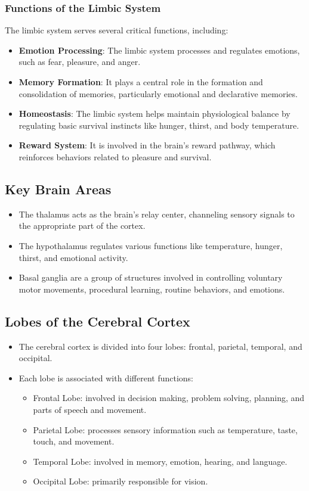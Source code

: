 \documentclass{article}
\begin{document}
\subsubsection{Functions of the Limbic System}

The limbic system serves several critical functions, including:

\begin{itemize}
  \item \textbf{Emotion Processing}: The limbic system processes and regulates emotions, such as fear, pleasure, and anger.
  \item \textbf{Memory Formation}: It plays a central role in the formation and consolidation of memories, particularly emotional and declarative memories.
  \item \textbf{Homeostasis}: The limbic system helps maintain physiological balance by regulating basic survival instincts like hunger, thirst, and body temperature.
  \item \textbf{Reward System}: It is involved in the brain's reward pathway, which reinforces behaviors related to pleasure and survival.
\end{itemize}

\subsection{Key Brain Areas}
\begin{itemize}
    \item The thalamus acts as the brain's relay center, channeling sensory signals to the appropriate part of the cortex.
    \item The hypothalamus regulates various functions like temperature, hunger, thirst, and emotional activity.
    \item Basal ganglia are a group of structures involved in controlling voluntary motor movements, procedural learning, routine behaviors, and emotions.
\end{itemize}

\subsection{Lobes of the Cerebral Cortex}
\begin{itemize}
    \item The cerebral cortex is divided into four lobes: frontal, parietal, temporal, and occipital.
    \item Each lobe is associated with different functions: 
        \begin{itemize}
            \item Frontal Lobe: involved in decision making, problem solving, planning, and parts of speech and movement.
            \item Parietal Lobe: processes sensory information such as temperature, taste, touch, and movement.
            \item Temporal Lobe: involved in memory, emotion, hearing, and language.
            \item Occipital Lobe: primarily responsible for vision.
        \end{itemize}
\end{itemize}
\end{document}
